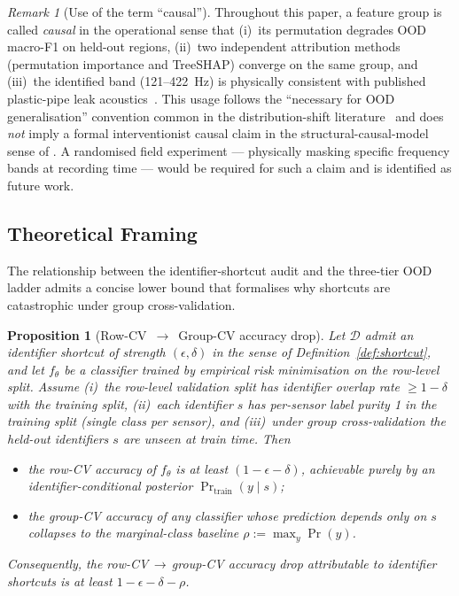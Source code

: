 \documentclass[3p,times,authoryear]{elsarticle}
\newtheorem{proposition}{Proposition}
\theoremstyle{remark}
\newtheorem{remark}{Remark}
\begin{document}
\begin{remark}[Use of the term ``causal'']\label{rem:causal}
Throughout this paper, a feature group is called \emph{causal}
in the operational sense that (i)~its permutation degrades OOD
macro-F1 on held-out regions, (ii)~two independent attribution
methods (permutation importance and TreeSHAP) converge on the
same group, and (iii)~the identified band (121--422~Hz) is
physically consistent with published plastic-pipe leak
acoustics~\cite{hunaidi2000plastic,almeida2014leak,gao2017model}.
This usage follows the ``necessary for OOD generalisation''
convention common in the distribution-shift
literature~\cite{arjovsky2019irm,scholkopf2021causal} and does
\emph{not} imply a formal interventionist causal claim in the
structural-causal-model sense of
\citet{pearl2009causality}. A randomised field experiment ---
physically masking specific frequency bands at recording time ---
would be required for such a claim and is identified as future
work.
\end{remark}

\subsection{Theoretical Framing}\label{sec:method-theory}

The relationship between the identifier-shortcut audit and the
three-tier OOD ladder admits a concise lower bound that
formalises why shortcuts are catastrophic under group
cross-validation.

\begin{proposition}[Row-CV~$\rightarrow$~Group-CV accuracy
drop]\label{prop:bound}
Let $\mathcal{D}$ admit an identifier shortcut of strength
$(\epsilon, \delta)$ in the sense of
Definition~\ref{def:shortcut}, and let $f_\theta$ be a
classifier trained by empirical risk minimisation on the
row-level split. Assume (\emph{i})~the row-level
validation split has identifier overlap rate
$\geq 1 - \delta$ with the training split, (\emph{ii})~each
identifier $s$ has per-sensor label purity 1 in the
training split (single class per sensor), and (\emph{iii})~under
group cross-validation the held-out identifiers $s$ are unseen at
train time. Then
\begin{itemize}
\item the row-CV accuracy of $f_\theta$ is at least
$(1 - \epsilon - \delta)$, achievable purely by an
identifier-conditional posterior $\Pr_{\mathrm{train}}(y \mid s)$;
\item the group-CV accuracy of any classifier whose
prediction depends only on $s$ collapses to the
marginal-class baseline $\rho := \max_y \Pr(y)$.
\end{itemize}
Consequently, the row-CV$\,\to\,$group-CV accuracy drop
attributable to identifier shortcuts is at least
$1 - \epsilon - \delta - \rho$.
\end{proposition}
\end{document}
